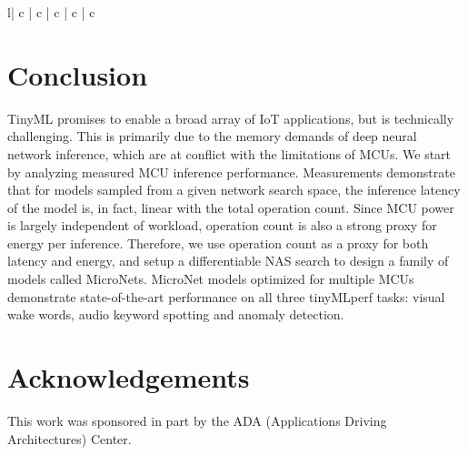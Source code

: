 \documentclass{article}
\begin{document}
\begin{table}[t]
\begin{tabular}{l| c | c | c | c | c}
\section{Conclusion}

TinyML promises to enable a broad array of IoT applications, but is technically challenging.
This is primarily due to the memory demands of deep neural network inference, which are at conflict with the limitations of MCUs.
We start by analyzing measured MCU inference performance.
Measurements demonstrate that for models sampled from a given network search space, the inference latency of the model is, in fact, linear with the total operation count.
Since MCU power is largely independent of workload, operation count is also a strong proxy for energy per inference.
Therefore, we use operation count as a proxy for both latency and energy, and setup a differentiable NAS search to design a family of models called MicroNets.
MicroNet models optimized for multiple MCUs demonstrate state-of-the-art performance on all three tinyMLperf tasks: visual wake words, audio keyword spotting and anomaly detection.



\section*{Acknowledgements}
This work was sponsored in part by the ADA (Applications Driving Architectures) Center.















\appendix

\begin{table*}[t]
  \caption{Results Table. (*) Estimated (-) Unable to measure do to SRAM or eFlash constraints. ProxylessNas ~\cite{cai2018proxylessnas}, MSNet~\cite{cheng2019msnet}, Person Detection~\cite{TFLM}, and MBNetV2-0.5~\cite{Giri2020} are all previous work.}
  \label{tab:full_results}
  \centering
  \scriptsize
{}
\end{table*}
\end{tabular}
\end{table}
\end{document}
